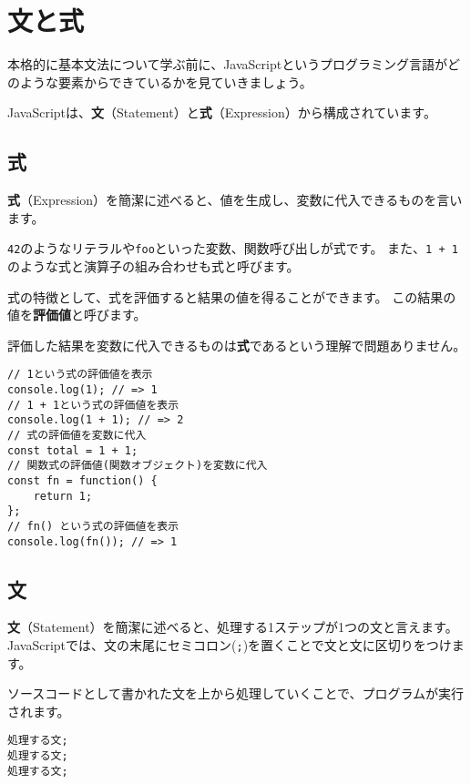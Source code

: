 \hypertarget{statement-and-expression}{%
\chapter{文と式}\label{statement-and-expression}}

本格的に基本文法について学ぶ前に、JavaScriptというプログラミング言語がどのような要素からできているかを見ていきましょう。

JavaScriptは、\textbf{文}（Statement）と\textbf{式}（Expression）から構成されています。

\hypertarget{expression}{%
\section{式}\label{expression}}

\textbf{式}（Expression）を簡潔に述べると、値を生成し、変数に代入できるものを言います。

\texttt{42}のようなリテラルや\texttt{foo}といった変数、関数呼び出しが式です。
また、\texttt{1 + 1}のような式と演算子の組み合わせも式と呼びます。

式の特徴として、式を評価すると結果の値を得ることができます。
この結果の値を\textbf{評価値}と呼びます。

評価した結果を変数に代入できるものは\textbf{式}であるという理解で問題ありません。

\begin{lstlisting}
// 1という式の評価値を表示
console.log(1); // => 1
// 1 + 1という式の評価値を表示
console.log(1 + 1); // => 2
// 式の評価値を変数に代入
const total = 1 + 1;
// 関数式の評価値(関数オブジェクト)を変数に代入
const fn = function() {
    return 1;
};
// fn() という式の評価値を表示
console.log(fn()); // => 1
\end{lstlisting}

\hypertarget{statement}{%
\section{文}\label{statement}}

\textbf{文}（Statement）を簡潔に述べると、処理する1ステップが1つの文と言えます。
JavaScriptでは、文の末尾にセミコロン(\texttt{;})を置くことで文と文に区切りをつけます。

ソースコードとして書かれた文を上から処理していくことで、プログラムが実行されます。

\begin{lstlisting}
処理する文;
処理する文;
処理する文;
\end{lstlisting}

